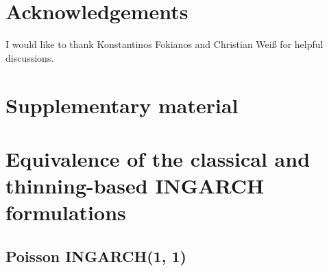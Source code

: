 \documentclass{article}
\begin{document}
\section*{Acknowledgements}

I would like to thank Konstantinos Fokianos and Christian Wei{\ss} for helpful discussions.


{
\footnotesize


}


\section{Supplementary material} %

\appendix
\section{Equivalence of the classical and thinning-based INGARCH formulations}
\label{appendix:proof}

\subsection{Poisson INGARCH(1, 1)}
\label{subsec:derivation_poisson11}
\end{document}
